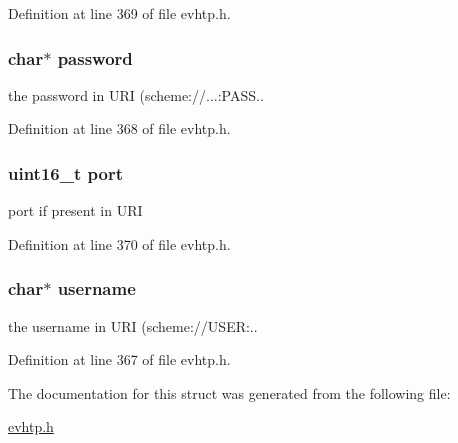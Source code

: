 \-Definition at line 369 of file evhtp.\-h.

\hypertarget{structevhtp__authority__s_a59460a3ff2c12443d1022e5cc0fba85c}{
\subsubsection[{password}]{\setlength{\rightskip}{0pt plus 5cm}char$\ast$ {\bf password}}}\label{structevhtp__authority__s_a59460a3ff2c12443d1022e5cc0fba85c}
the password in \-U\-R\-I (scheme\-://...\-:\-P\-A\-S\-S.. 

\-Definition at line 368 of file evhtp.\-h.

\hypertarget{structevhtp__authority__s_a8e0798404bf2cf5dabb84c5ba9a4f236}{
\subsubsection[{port}]{\setlength{\rightskip}{0pt plus 5cm}uint16\-\_\-t {\bf port}}}\label{structevhtp__authority__s_a8e0798404bf2cf5dabb84c5ba9a4f236}
port if present in \-U\-R\-I 

\-Definition at line 370 of file evhtp.\-h.

\hypertarget{structevhtp__authority__s_a9b20c006bd90a09e1465fb668700e81d}{
\subsubsection[{username}]{\setlength{\rightskip}{0pt plus 5cm}char$\ast$ {\bf username}}}\label{structevhtp__authority__s_a9b20c006bd90a09e1465fb668700e81d}
the username in \-U\-R\-I (scheme\-://\-U\-S\-E\-R\-:.. 

\-Definition at line 367 of file evhtp.\-h.



\-The documentation for this struct was generated from the following file\-:\begin{DoxyCompactItemize}
\item 
\hyperlink{evhtp_8h}{evhtp.\-h}\end{DoxyCompactItemize}
